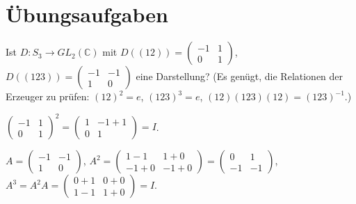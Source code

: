 \section{Übungsaufgaben}

\begin{aufgabe}
Ist $D\colon S_3\to GL_2(\mathbb C)$ mit $D((12)) = \begin{pmatrix}-1 & 1\\ 0 & 1\end{pmatrix}$, $D((123)) = \begin{pmatrix}-1 & -1\\ 1 & 0\end{pmatrix}$ eine Darstellung? (Es genügt, die Relationen der Erzeuger zu prüfen: $(12)^{2} = e$, $(123)^{3} = e$, $(12)(123)(12) = (123)^{-1}$.)

\loesung
{}
$\begin{pmatrix}-1 & 1\\ 0 & 1\end{pmatrix}^{2} = \begin{pmatrix}1 & -1 + 1\\ 0 & 1\end{pmatrix} = I$. \checkmark

$A = \begin{pmatrix}-1 & -1\\ 1 & 0\end{pmatrix}$, $A^{2} = \begin{pmatrix}1 - 1 & 1 + 0\\ -1 + 0 & -1 + 0\end{pmatrix} = \begin{pmatrix}0 & 1\\ -1 & -1\end{pmatrix}$, $A^{3} = A^{2}A = \begin{pmatrix}0 + 1 & 0 + 0\\ 1 - 1 & 1 + 0\end{pmatrix} = I$. \checkmark


\end{aufgabe}

